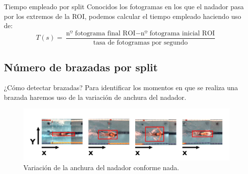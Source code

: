 \documentclass[11pt]{beamer}
\begin{document}
        \begin{frame}{Tiempo empleado por split}
            Conocidos los fotogramas en los que el nadador pasa por los extremos de la ROI, podemos calcular el tiempo empleado haciendo uso de: \\
            \begin{equation}
                    T (s) = \frac{\text{nº fotograma final ROI} - \text{nº fotograma inicial ROI}}{ \text{tasa de fotogramas por segundo}}
            \end{equation}
        \end{frame}
        
        \subsection{Número de brazadas por split}
        
        \begin{frame}{¿Cómo detectar brazadas?}
            Para identificar los momentos en que se realiza una brazada haremos uso de la variación de anchura del nadador.
            \begin{figure}
                \centering
                \includegraphics[scale=0.3]{imagenes/variacion_anchura_nadador.png}
                \caption{Variación de la anchura del nadador conforme nada.}
                \label{fig:variacionanchura}
            \end{figure}
        \end{frame}
        
\end{document}
